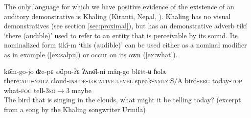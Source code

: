 \documentclass[oneside,a4paper,11pt]{article}
\newcommand{\ipa}[1]{{\phon \mbox{#1}}} %
\begin{document}
\begin{table}[H]
\caption{Non-propositional evidential systems with non-visual sensory evidentials } \label{tab:attested}
\end{table}	
 
The only language for which we have positive evidence of the existence of an auditory demonstrative is Khaling (Kiranti, Nepal, \citealt{jacques14auditory}). Khaling has no visual demonstratives (see section \ref{sec:proximal}), but has an demonstrative adverb \ipa{tikí} `there (audible)' used to refer to an entity that is perceivable by its sound. Its nominalized form \ipa{tikî-m} `this (audible)' can be used either as a nominal modifier as in  example (\ref{ex:salpu}) or occur on its own (\ref{ex:what}). 

\begin{exe}
\ex \label{ex:salpu}
\gll    	 	\ipa{tikî-m}   	\ipa{kɵ̂m-go-jo}   	\ipa{ʣe-pɛ}   	\ipa{sʌ̄lpu-ʔɛ}   	\ipa{ʔʌnɵ̂l-ni}   	\ipa{mâŋ-go}   	\ipa{blɛtt-ʉ}   	\ipa{ɦolʌ}   
 \\
 there:\textsc{aud}-\textsc{nmlz} cloud-\textsc{inside-locative.level} speak-\textsc{nmlz:}S/A bird-\textsc{erg} today-\textsc{top} what-\textsc{foc} tell-\textsc{3sg$\rightarrow$3} maybe \\
\glt The bird that is singing in the clouds, what might it be telling today? (excerpt from a song by the Khaling songwriter Urmila)
\end{exe}
\end{document}
